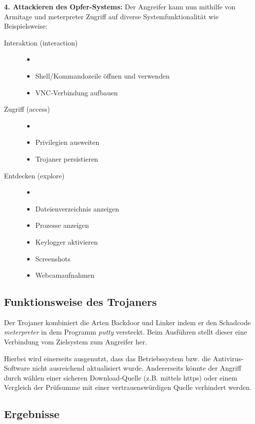 \bigskip
\textbf{4. Attackieren des Opfer-Systems: }
Der Angreifer kann nun mithilfe von Armitage und meterpreter Zugriff auf diverse Systemfunktionalität wie Beispielsweise:
\begin{description}
	\item[Interaktion (interaction)]
		\begin{itemize}
			\item[]  
			\item Shell/Kommandozeile öffnen und verwenden
			\item VNC-Verbindung aufbauen
		\end{itemize}
	\item[Zugriff (access)]
		\begin{itemize}
			\item[]
			\item Privilegien ausweiten
			\item Trojaner persistieren
		\end{itemize}
	\item[Entdecken (explore)]  
		\begin{itemize}
			\item[]  
			\item Dateienverzeichnis anzeigen
			\item Prozesse anzeigen
			\item Keylogger aktivieren
			\item Screenshots
			\item Webcamaufnahmen 
		\end{itemize}
\end{description}

\subsection{Funktionsweise des Trojaners}\label{sec:praktischeDurchfuehrung-funktionsweise}
Der Trojaner kombiniert die Arten Backdoor und Linker indem er den Schadcode \textit{meterpreter} 
in dem Programm \textit{putty} versteckt.
Beim Ausführen stellt dieser eine Verbindung vom Zielsystem zum Angreifer her.

Hierbei wird einerseits ausgenutzt, dass das Betriebssystem bzw. die Antivirus-Software nicht ausreichend aktualisiert wurde.
Andererseits könnte der Angriff durch wählen einer sicheren Download-Quelle (z.B. mittels https)
oder einem Vergleich der Prüfsumme mit einer vertrauenswürdigen Quelle verhindert werden.

\subsection{Ergebnisse}\label{sec:praktischeDurchfuehrung-ergebnisse}

